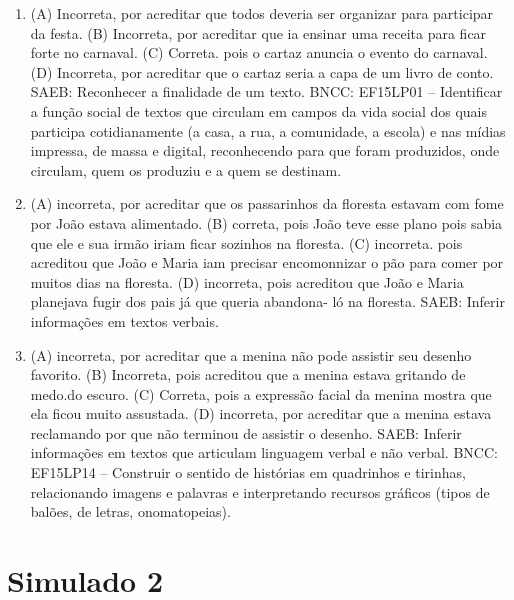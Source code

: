 \begin{enumerate}
\item
(A) Incorreta, por acreditar que todos deveria ser organizar para
participar da festa.
(B) Incorreta, por acreditar que ia ensinar uma receita para ficar
forte no carnaval.
(C) Correta. pois o cartaz anuncia o evento do carnaval.
(D) Incorreta, por acreditar que o cartaz seria a capa de um livro de
conto.
SAEB: Reconhecer a finalidade de um texto.
BNCC: EF15LP01 -- Identificar a função social de textos que
circulam em campos da vida social dos quais participa cotidianamente (a
casa, a rua, a comunidade, a escola) e nas mídias impressa, de massa e
digital, reconhecendo para que foram produzidos, onde circulam, quem os
produziu e a quem se destinam.

\item
(A) incorreta, por acreditar que os passarinhos da floresta estavam com
fome por João estava alimentado.
(B) correta, pois João teve esse plano pois sabia que ele e sua irmão
iriam ficar sozinhos na floresta.
(C) incorreta. pois acreditou que João e Maria iam precisar encomonnizar
o pão para comer por muitos dias na floresta.
(D) incorreta, pois acreditou que João e Maria planejava fugir dos pais
já que queria abandona- ló na floresta.
SAEB: Inferir informações em textos verbais.

\item
(A) incorreta, por acreditar que a menina não pode assistir seu desenho
favorito.
(B) Incorreta, pois acreditou que a menina estava gritando de medo.do
escuro.
(C) Correta, pois a expressão facial da menina mostra que ela ficou
muito assustada.
(D) incorreta, por acreditar que a menina estava reclamando por que não
terminou de assistir o desenho.
SAEB: Inferir informações em textos que articulam linguagem
verbal e não verbal.
BNCC: EF15LP14 -- Construir o sentido de histórias em
quadrinhos e tirinhas, relacionando imagens e palavras e interpretando
recursos gráficos (tipos de balões, de letras, onomatopeias).
\end{enumerate}

\section*{Simulado 2}

